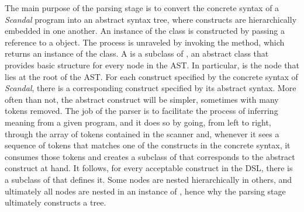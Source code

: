 The main purpose of the parsing stage is to convert the concrete syntax of a \emph{Scandal} program into an abstract syntax tree, where constructs are hierarchically embedded in one another. An instance of the  class is constructed by passing a reference to a  object. The process is unraveled by invoking the  method, which returns an instance of the  class. A  is a subclass of , an abstract class that provides basic structure for every node in the AST. In particular,  is the node that lies at the root of the AST. For each construct specified by the concrete syntax of \emph{Scandal}, there is a corresponding construct specified by its abstract syntax. More often than not, the abstract construct will be simpler, sometimes with many tokens removed. The job of the parser is to facilitate the process of inferring meaning from a given program, and it does so by going, from left to right, through the array of tokens contained in the scanner and, whenever it sees a sequence of tokens that matches one of the constructs in the concrete syntax, it consumes those tokens and creates a subclass of  that corresponds to the abstract construct at hand. It follows, for every acceptable construct in the DSL, there is a subclass of  that defines it. Some nodes are nested hierarchically in others, and ultimately all nodes are nested in an instance of , hence why the parsing stage ultimately constructs a tree.

